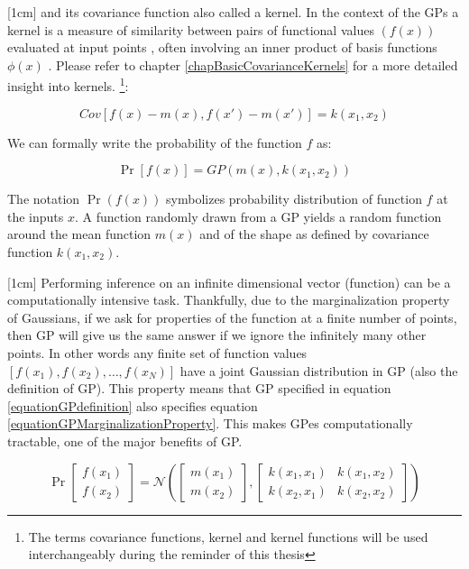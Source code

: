 [1cm]
and its covariance function also called a kernel. In the context of the GPs a kernel is a measure of similarity between pairs of functional values $(f(x))$ evaluated at input points , often involving an inner product of basis functions $\phi(x)$ \cite{bishop2006pattern}. Please refer to chapter \ref{chapBasicCovarianceKernels} for a more detailed insight into kernels.   \footnote{The terms covariance functions, kernel and kernel functions will be used interchangeably during the reminder of this thesis}:

\begin{equation}\label{eq:covarianceGP}
Cov[f(x) - m(x), f(x') - m(x')] = k(x_{1}, x_{2})
\end{equation}

We can formally write the probability of the function $f$ as:

\begin{equation}\label{equationGPdefinition}
\Pr[f(x)] = GP(m(x), k(x_{1}, x_{2}))
\end{equation}

The notation $\Pr(f( x))$ symbolizes probability distribution of function $f$ at the inputs $x$. A function randomly drawn from a GP yields a random function around the mean function $m(x)$ and of the shape as defined by covariance function $k(x_{1}, x_{2})$. 

[1cm]
Performing inference on an infinite dimensional vector (function) can be a computationally intensive task. Thankfully, due to the marginalization property of Gaussians, if we ask for properties of the function at a finite number of points, then  GP will give us the same answer if we ignore the infinitely many other points. In other words any finite set of function values $[f(x_{1}), f(x_{2}), \ldots, f(x_{N})]$ have a joint Gaussian distribution in GP (also the  definition of GP). This property means that GP specified in equation \ref{equationGPdefinition} also specifies equation \ref{equationGPMarginalizationProperty}. This makes GPes computationally tractable, one of the major benefits of GP. 


\begin{equation}\label{equationGPMarginalizationProperty}
\Pr\left [ \begin{matrix}
f(x_{1})
\\ f(x_{2})
\end{matrix} \right ] = \mathcal{N}\left (\left [ \begin{matrix}
m(x_{1})
\\ m(x_{2})

\end{matrix} \right ] , \left [ \begin{matrix}
k(x_{1}, x_{1}) & k(x_{1}, x_{2})\\ 
k(x_{2}, x_{1}) & k(x_{2}, x_{2})
\end{matrix} \right ] \right )
\end{equation}


